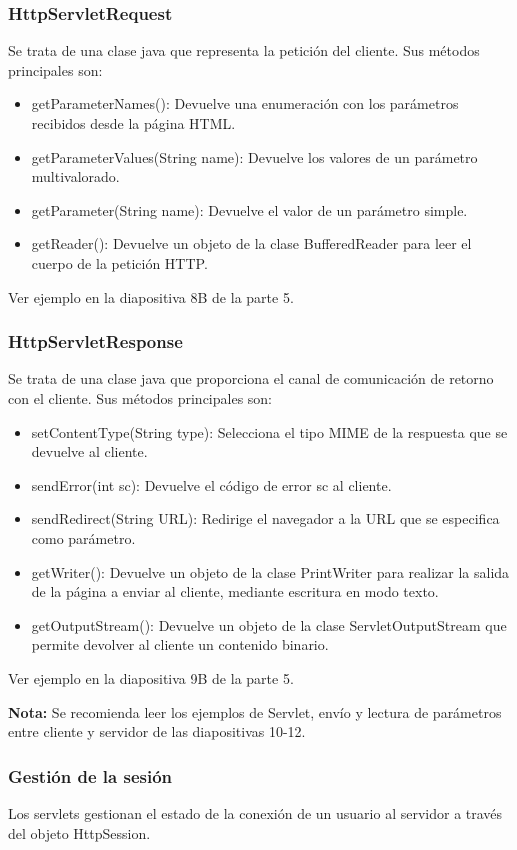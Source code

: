 \documentclass{apuntes}
\begin{document}
\subsubsection{HttpServletRequest}
Se trata de una clase java que representa la petición del cliente. Sus métodos principales son:
\begin{itemize}
\item getParameterNames(): Devuelve una enumeración con los
parámetros recibidos desde la página HTML.
\item getParameterValues(String name): Devuelve los valores de un parámetro multivalorado.
\item getParameter(String name): Devuelve el valor de un
parámetro simple.
\item getReader(): Devuelve un objeto de la clase BufferedReader para leer el cuerpo de la petición HTTP.
\end{itemize}

Ver ejemplo en la diapositiva 8B de la parte 5.
\subsubsection{HttpServletResponse}
Se trata de una clase java que proporciona el canal de comunicación de retorno con el cliente. Sus métodos principales son:
\begin{itemize}
\item setContentType(String type): Selecciona el tipo MIME de
la respuesta que se devuelve al cliente.
\item sendError(int sc): Devuelve el código de error sc al cliente.
\item sendRedirect(String URL): Redirige el navegador a la URL que se especifica como parámetro.
\item getWriter(): Devuelve un objeto de la clase PrintWriter
para realizar la salida de la página a enviar al cliente, mediante escritura en modo texto.
\item getOutputStream(): Devuelve un objeto de la clase
ServletOutputStream que permite devolver al cliente un
contenido binario.
\end{itemize}

Ver ejemplo en la diapositiva 9B de la parte 5.

\textbf{Nota:} Se recomienda leer los ejemplos de Servlet, envío  y lectura de parámetros entre cliente y servidor de las diapositivas 10-12.


\subsubsection{Gestión de la sesión}
Los servlets gestionan el estado de la conexión de un usuario al servidor  a través del objeto HttpSession.
\end{document}
